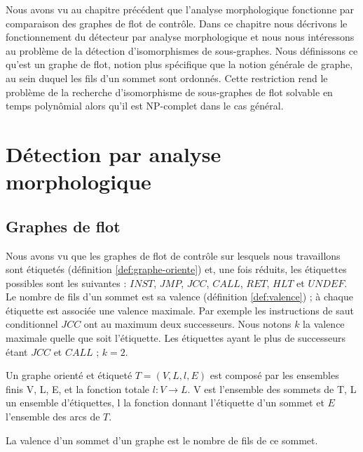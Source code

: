 Nous avons vu au chapitre précédent que l'analyse morphologique fonctionne par comparaison des graphes de flot de contrôle.
Dans ce chapitre nous décrivons le fonctionnement du détecteur par analyse morphologique et nous nous intéressons au problème de la détection d'isomorphismes de sous-graphes. 
Nous définissons ce qu'est un graphe de flot, notion plus spécifique que la notion générale de graphe, au sein duquel les fils d'un sommet sont ordonnés.
Cette restriction rend le problème de la recherche d'isomorphisme de sous-graphes de flot solvable en temps polynômial alors qu'il est NP-complet dans le cas général.

\section{Détection par analyse morphologique}
\subsection{Graphes de flot}
Nous avons vu que les graphes de flot de contrôle sur lesquels nous travaillons sont étiquetés (définition \ref{def:graphe-oriente}) et, une fois réduits, les étiquettes possibles sont les suivantes : $INST$, $JMP$, $JCC$, $CALL$, $RET$, $HLT$ et $UNDEF$.
Le nombre de fils d'un sommet est sa valence (définition \ref{def:valence}) ; à chaque étiquette est associée une valence maximale. Par exemple les instructions de saut conditionnel $JCC$ ont au maximum deux successeurs.
Nous notons $k$ la valence maximale quelle que soit l'étiquette. Les étiquettes ayant le plus de successeurs étant $JCC$ et $CALL$ ; $k=2$.

\begin{defi}
Un graphe orienté et étiqueté $T=(V, L, l, E)$ est composé par les ensembles finis V, L, E, et la fonction totale $l:V\rightarrow L$.
V est l'ensemble des sommets de T, L un ensemble d'étiquettes, l la fonction donnant l'étiquette d'un sommet et $E$ l'ensemble des arcs de $T$.
\label{def:graphe-oriente}
\end{defi}

\begin{defi}\label{def:valence}
 La valence d'un sommet d'un graphe est le nombre de fils de ce sommet.
\end{defi}


